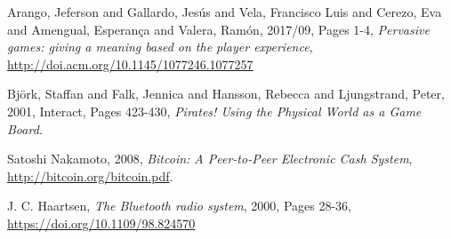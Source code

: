 %
%
%
\begin{thebibliography}{1}

  Arango, Jeferson and Gallardo, Jesús and Vela, Francisco Luis and Cerezo, Eva 
and Amengual, Esperança and Valera, Ramón,
  2017/09,
  Pages 1-4,
  \emph{Pervasive games: giving a meaning based on the player experience},
  \url{http://doi.acm.org/10.1145/1077246.1077257}
  
  Bj{\"o}rk, Staffan and Falk, Jennica and Hansson, Rebecca and Ljungstrand, 
Peter,
  2001,
  Interact, Pages 423-430,
  \emph{Pirates! Using the Physical World as a Game Board.}
  
  Satoshi Nakamoto,
  2008,
  \emph{Bitcoin: A Peer-to-Peer Electronic Cash System},
  \url{http://bitcoin.org/bitcoin.pdf}.
  
  J. C. Haartsen,
  \emph{The Bluetooth radio system},
  2000,
  Pages 28-36,
  \url{https://doi.org/10.1109/98.824570}

\end{thebibliography}
